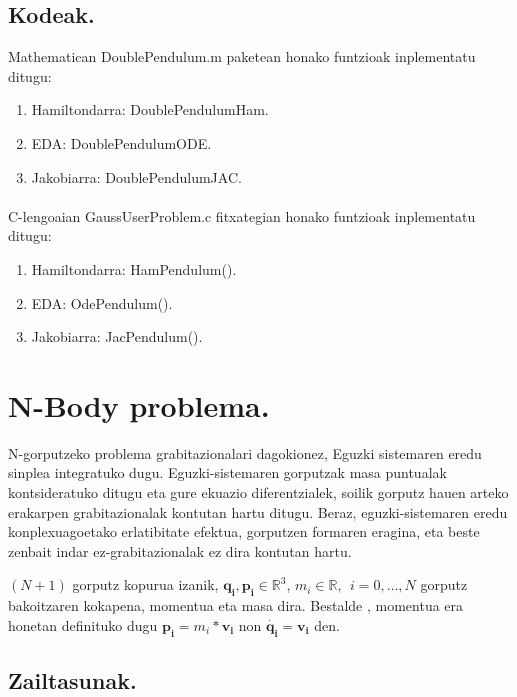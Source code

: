 \subsection{Kodeak.}

Mathematican DoublePendulum.m paketean honako funtzioak inplementatu ditugu:

\begin{enumerate}
   \item Hamiltondarra: DoublePendulumHam.
   \item EDA: DoublePendulumODE.
   \item Jakobiarra: DoublePendulumJAC.
\end{enumerate}

\paragraph*{}C-lengoaian GaussUserProblem.c fitxategian honako funtzioak inplementatu ditugu:

\begin{enumerate}
   \item Hamiltondarra: HamPendulum().
   \item EDA: OdePendulum().
   \item Jakobiarra: JacPendulum().
\end{enumerate}

\section{N-Body problema.}

N-gorputzeko problema grabitazionalari dagokionez, Eguzki sistemaren eredu sinplea integratuko dugu. Eguzki-sistemaren gorputzak masa puntualak kontsideratuko ditugu eta gure ekuazio diferentzialek, soilik gorputz hauen arteko erakarpen grabitazionalak kontutan hartu ditugu. Beraz, eguzki-sistemaren eredu konplexuagoetako erlatibitate efektua, gorputzen formaren eragina, eta beste zenbait indar ez-grabitazionalak ez dira kontutan hartu.

$(N+1)$ gorputz kopurua izanik, $\mathbf{q_i},\mathbf{p_i}\in \mathbb{R}^3$, $m_i \in \mathbb{R}, \ \ i=0,\dots,N$ gorputz bakoitzaren kokapena, momentua eta masa dira. Bestalde , momentua era honetan definituko dugu $\mathbf{p_i}=m_i*\mathbf{v_i}$ non $\dot{\mathbf{q_i}}=\mathbf{v_i}$ den.

\subsection{Zailtasunak.}

